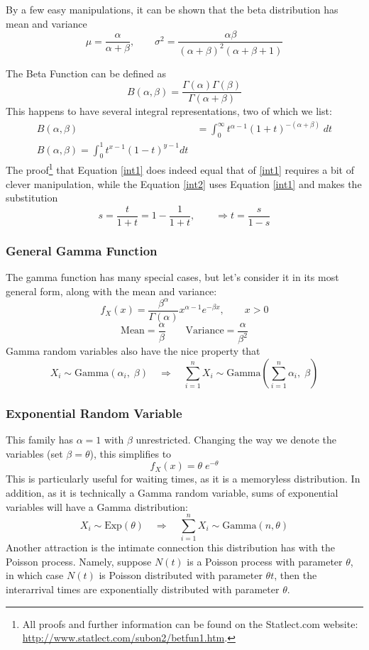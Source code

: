 \documentclass[12pt]{article}
\theoremstyle{plain}
\theoremstyle{definition}
\theoremstyle{remark}
\begin{document}
By a few easy manipulations, it can be shown that the beta distribution
has mean and variance
\begin{equation}
   \label{beta}
    \mu = \frac{\alpha}{\alpha+\beta}, \qquad \sigma^2 =
      \frac{\alpha\beta}{(\alpha+\beta)^2 (\alpha+\beta+1)}
\end{equation}

The Beta Function can be defined as
\[ B(\alpha, \beta) = \frac{\Gamma(\alpha) \Gamma(\beta)}{\Gamma(\alpha
   + \beta)} \]
This happens to have several integral representations, two of which
we list:
\begin{align}
   B(\alpha, \beta) &= \int^{\infty}_0 t^{\alpha-1} (1+t)^{-(\alpha+
   \beta)} \; dt \label{int1} \\
   B(\alpha, \beta) = \int^1_0 t^{x-1} (1-t)^{y-1} dt \label{int2}
\end{align}
The proof\footnote{All proofs and further information can be found
   on the Statlect.com website:
   \url{http://www.statlect.com/subon2/betfun1.htm}. }
that Equation \ref{int1} does indeed equal that of \ref{int1}
requires a bit of clever manipulation, while the Equation \ref{int2} uses
Equation \ref{int1} and makes the substitution
   \[ s = \frac{t}{1+t} = 1-\frac{1}{1+t}, \qquad \Rightarrow
      t = \frac{s}{1-s} \]


\subsubsection{General Gamma Function}

The gamma function has many special cases, but let's consider it
in its most general form, along with the mean and variance:
\begin{equation}
   f_X(x) = \frac{\beta^\alpha}{\Gamma(\alpha)} x^{\alpha-1}
      e^{-\beta x}, \qquad x > 0
\end{equation}
\[ \text{Mean} = \frac{\alpha}{\beta} \qquad \text{Variance} =
   \frac{\alpha}{\beta^2} \]
Gamma random variables also have the nice property that
\[ X_i \sim \text{Gamma}(\alpha_i, \;\beta) \quad \Rightarrow \quad
   \sum^n_{i=1} X_i \sim \text{Gamma}\left(\sum^n_{i=1} \alpha_i,\;\beta
   \right) \]

\subsubsection{Exponential Random Variable}

This family has $\alpha=1$ with $\beta$ unrestricted. Changing the way
we denote the variables (set $\beta =\theta$), this simplifies to
   \[ f_X(x) = \theta\; e^{-\theta} \]
This is particularly useful for waiting times, as it is a memoryless
distribution. In addition, as it is technically a Gamma random
variable, sums of exponential variables will have a Gamma distribution:
\[ X_i \sim \text{Exp}(\theta) \quad \Rightarrow \quad
   \sum^n_{i=1} X_i \sim \text{Gamma}(n, \theta) \]
Another attraction is the intimate connection this distribution has
with the Poisson process.  Namely, suppose $N(t)$ is a Poisson process
with parameter $\theta$, in which case $N(t)$ is Poisson distributed
with parameter $\theta t$, then the interarrival times are
exponentially distributed with parameter $\theta$.
\end{document}
